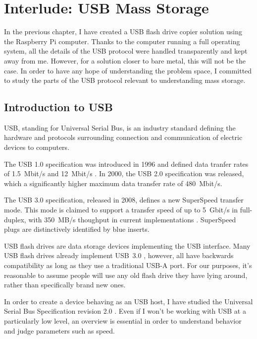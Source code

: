 \chapter{Interlude: USB Mass Storage}
    In the previous chapter, I have created a USB flash drive copier solution using the Raspberry Pi computer.  Thanks to the computer running a full operating system, all the details of the USB protocol were handled transparently and kept away from me.  However, for a solution closer to bare metal, this will not be the case.  In order to have any hope of understanding the problem space, I committed to study the parts of the USB protocol relevant to understanding mass storage.
    
    \section{Introduction to USB}
    
    USB, standing for Universal Serial Bus, is an industry standard defining the hardware and protocols surrounding connection and communication of electric devices to computers\cite{lifewire-usb}.  
    
    The USB 1.0 specification was introduced in 1996 and defined data tranfer rates of 1.5~Mbit/s and 12~Mbit/s \cite{hui1394}.  In 2000, the USB 2.0 specification was released, which a significantly higher maximum data transfer rate of 480~Mbit/s\cite{usb-specification}.  %
    
    The USB 3.0 specification, released in 2008, defines a new SuperSpeed transfer mode.  This mode is claimed to support a transfer speed of up to 5~Gbit/s in full-duplex, with 350~MB/s thoughput in current implementations \cite{usb-3-hp}.  SuperSpeed plugs are distinctively identified by blue inserts.%
    
    USB flash drives are data storage devices implementing the USB interface.  Many USB flash drives already implement USB~3.0 \cite{wirecutter-best-usb-3-0}, however, all have backwards compatibility as long as they use a traditional USB‑A port.  For our purposes, it's reasonable to assume people will use any old flash drive they have lying around, rather than specifically brand new ones.
    
    In order to create a device behaving as an USB host, I have studied the Universal Serial Bus Specification revision 2.0 \cite{usb-specification}.  Even if I won't be working with USB at a particularly low level, an overview is essential in order to understand behavior and judge parameters such as speed.
    

